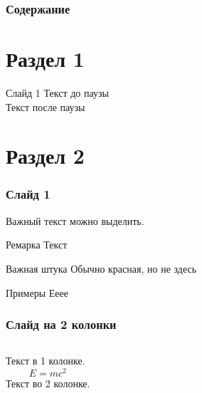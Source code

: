 \documentclass[13pt,hyperref={unicode,naturalnames}]{beamer}
\begin{document}
\frame{\titlepage}
\begin{frame}
\frametitle{Содержание}
\tableofcontents
\end{frame}
\section{Раздел 1}
\begin{frame}{Слайд 1}
    Текст до паузы\\
    \pause
    Текст после паузы
\end{frame}
\section{Раздел 2}
\begin{frame}
\frametitle{Слайд 1}
Важный текст можно
\alert{выделить}.
\begin{block}{Ремарка}
Текст
\end{block}
\begin{alertblock}{Важная штука}
Обычно красная, но не здесь
\end{alertblock}
\begin{exampleblock}{Примеры}
Ееее
\end{exampleblock}
\end{frame}
\begin{frame}
\frametitle{Слайд на 2 колонки}
\begin{columns}
Текст в 1 колонке.
$$E=mc^2$$
Текст во 2 колонке.
\end{columns}
\end{frame}
\end{document}
